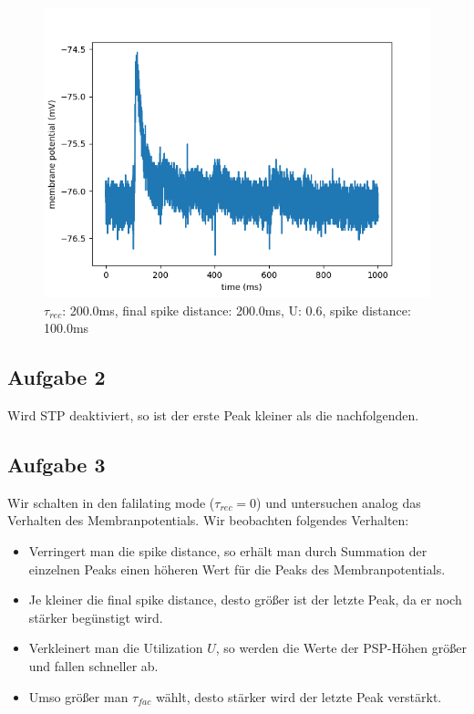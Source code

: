 \documentclass[10pt,a4paper]{scrartcl}
\begin{document}
\newpage

\begin{figure} [ht]
\begin{center}
\label{fig:abb21}
\caption{$\tau_{rec}$: 200.0ms, final spike distance: 200.0ms, U: 0.6, spike distance: 100.0ms}
\includegraphics[scale=0.35]{pictures/final_spike_variation_11.pdf} 
\end{center}
\end{figure}


\subsection{Aufgabe 2}
Wird STP deaktiviert, so ist der erste Peak kleiner als die nachfolgenden.


\subsection{Aufgabe 3}
Wir schalten in den falilating mode ($\tau_{rec} = 0$) und untersuchen analog das Verhalten des Membranpotentials. Wir beobachten folgendes Verhalten:
\begin{itemize}
\item Verringert man die spike distance, so erhält man durch Summation der einzelnen Peaks einen höheren Wert für die Peaks des Membranpotentials.
\item Je kleiner die final spike distance, desto größer ist der letzte Peak, da er noch stärker begünstigt wird.
\item Verkleinert man die Utilization $U$, so werden die Werte der PSP-Höhen größer und fallen schneller ab.
\item Umso größer man $\tau_{fac}$ wählt, desto stärker wird der letzte Peak verstärkt.
\end{itemize} 
\end{document}
